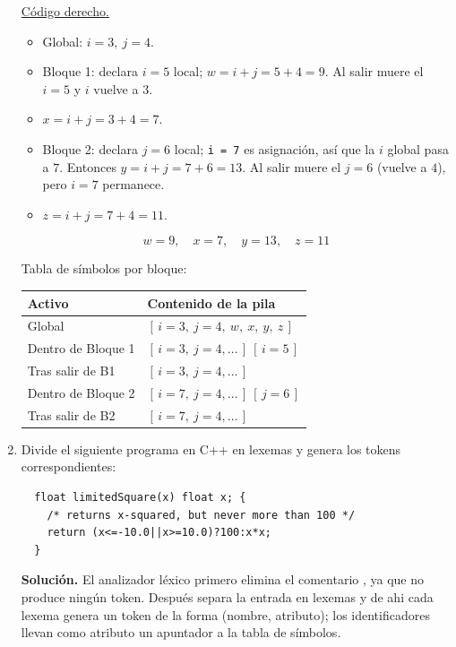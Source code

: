 \documentclass[12pt, letterpaper]{article}
\begin{document}
\begin{enumerate}
  \medskip
  \noindent\underline{Código derecho.}
  \begin{itemize}[nosep]
  \item Global: $i=3,\ j=4$.
  \item Bloque 1: declara $i=5$ local; $w = i + j = 5 + 4 = 9$. Al salir muere el $i=5$ y $i$ vuelve a $3$.
  \item $x = i + j = 3 + 4 = 7$.
  \item Bloque 2: declara $j=6$ local; \texttt{i = 7} es asignación, así que la $i$ global pasa a $7$.
    Entonces $y = i + j = 7 + 6 = 13$. Al salir muere el $j=6$ (vuelve a $4$), pero $i=7$ permanece.
  \item $z = i + j = 7 + 4 = 11$.
  \end{itemize}
  \[ \boxed{w = 9,\quad x = 7,\quad y = 13,\quad z = 11} \]

  Tabla de símbolos por bloque:
  \begin{center}
    \begin{tabular}{ll}
      \toprule
      \textbf{Activo} & \textbf{Contenido de la pila} \\
      \midrule
      Global            & $[\,i{=}3,\ j{=}4,\ w,\ x,\ y,\ z\,]$ \\
      Dentro de Bloque 1 & $[\,i{=}3,\ j{=}4,\dots\,]\ [\,i{=}5\,]$ \\
      Tras salir de B1   & $[\,i{=}3,\ j{=}4,\dots\,]$ \\
      Dentro de Bloque 2 & $[\,i{=}7,\ j{=}4,\dots\,]\ [\,j{=}6\,]$ \\
      Tras salir de B2   & $[\,i{=}7,\ j{=}4,\dots\,]$ \\
      \bottomrule
    \end{tabular}
  \end{center}


\item Divide el siguiente programa en C++ en lexemas y genera los tokens correspondientes:
  {\footnotesize \begin{verbatim}
  float limitedSquare(x) float x; {
    /* returns x-squared, but never more than 100 */
    return (x<=-10.0||x>=10.0)?100:x*x;
  }
\end{verbatim}}

    \bigskip
    \noindent\textbf{Solución.} El analizador léxico primero elimina el comentario
    , ya que no produce ningún token. Después separa la entrada en
    lexemas y de ahi cada lexema genera un token de la forma (nombre, atributo); los identificadores
    llevan como atributo un apuntador a la tabla de símbolos.


\end{enumerate}
\end{document}
